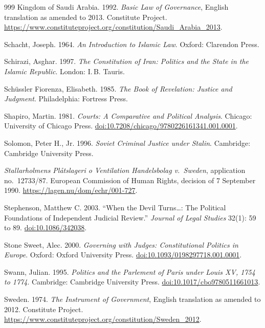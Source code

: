\documentclass[11pt,letterpaper]{article}
\theoremstyle{definition}
\theoremstyle{remark}
\begin{document}
\begin{thebibliography}{999}
Kingdom of Saudi Arabia. 1992. \emph{Basic Law of Governance}, English translation as amended to 2013. Constitute Project. \url{https://www.constituteproject.org/constitution/Saudi_Arabia_2013}.

Schacht, Joseph. 1964. \emph{An Introduction to Islamic Law}. Oxford: Clarendon Press.

Schirazi, Asghar. 1997. \emph{The Constitution of Iran: Politics and the State in the Islamic Republic}. London: I.\,B. Tauris.

Sch\"ussler Fiorenza, Elisabeth. 1985. \emph{The Book of Revelation: Justice and Judgment}. Philadelphia: Fortress Press.

Shapiro, Martin. 1981. \emph{Courts: A Comparative and Political Analysis}. Chicago: University of Chicago Press. \href{https://doi.org/10.7208/chicago/9780226161341.001.0001}{doi:10.7208/chicago/9780226161341.001.0001}.

Solomon, Peter H., Jr. 1996. \emph{Soviet Criminal Justice under Stalin}. Cambridge: Cambridge University Press.

\emph{Stallarholmens Pl\aa tslageri o Ventilation Handelsbolag v.\ Sweden}, application no.~12733/87. European Commission of Human Rights, decision of 7 September 1990. \url{https://lagen.nu/dom/echr/001-727}.

Stephenson, Matthew C. 2003. ``When the Devil Turns\ldots: The Political Foundations of Independent Judicial Review.'' \emph{Journal of Legal Studies} 32(1): 59 to 89. \href{https://doi.org/10.1086/342038}{doi:10.1086/342038}.

Stone Sweet, Alec. 2000. \emph{Governing with Judges: Constitutional Politics in Europe}. Oxford: Oxford University Press. \href{https://doi.org/10.1093/0198297718.001.0001}{doi:10.1093/0198297718.001.0001}.

Swann, Julian. 1995. \emph{Politics and the Parlement of Paris under Louis XV, 1754 to 1774}. Cambridge: Cambridge University Press. \href{https://doi.org/10.1017/cbo9780511661013}{doi:10.1017/cbo9780511661013}.

Sweden. 1974. \emph{The Instrument of Government}, English translation as amended to 2012. Constitute Project. \url{https://www.constituteproject.org/constitution/Sweden_2012}.


\end{thebibliography}
\end{document}
